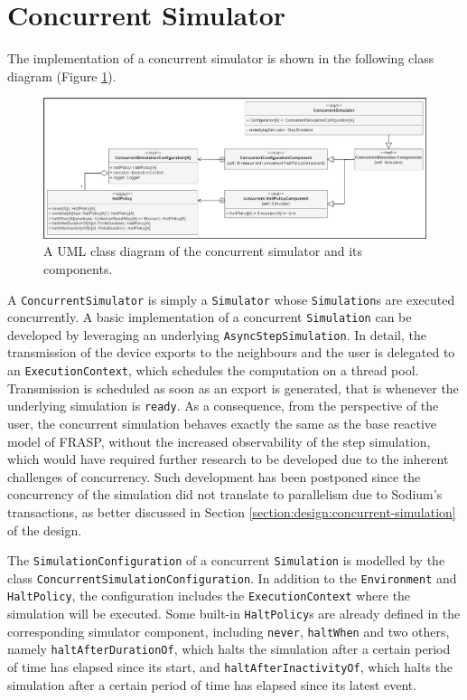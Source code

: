 
\section{Concurrent Simulator}
\label{section:implementation:concurrent-simulator}

The implementation of a concurrent simulator is shown in the following class
diagram (Figure \ref{figure:concurrent-simulator-class-diagram}).

\begin{figure}[!ht]
  \centering
  \includegraphics[width=1\textwidth]{resources/figures/concurrent-simulator-class-diagram.png}
  \caption{A UML class diagram of the concurrent simulator and its components.}
  \label{figure:concurrent-simulator-class-diagram}
\end{figure}

A \texttt{ConcurrentSimulator} is simply a \texttt{Simulator} whose
\texttt{Simulation}s are executed concurrently. A basic implementation of a
concurrent \texttt{Simulation} can be developed by leveraging an underlying
\texttt{AsyncStepSimulation}. In detail, the transmission of the device exports
to the neighbours and the user is delegated to an \texttt{ExecutionContext},
which schedules the computation on a thread pool. Transmission is scheduled as
soon as an export is generated, that is whenever the underlying simulation is
\texttt{ready}. As a consequence, from the perspective of the user, the
concurrent simulation behaves exactly the same as the base reactive model of
FRASP, without the increased observability of the step simulation, which would
have required further research to be developed due to the inherent challenges
of concurrency. Such development has been postponed since the concurrency of
the simulation did not translate to parallelism due to Sodium's transactions,
as better discussed in Section \ref{section:design:concurrent-simulation} of
the design.

The \texttt{SimulationConfiguration} of a concurrent \texttt{Simulation} is
modelled by the class \texttt{ConcurrentSimulationConfiguration}. In addition
to the \texttt{Environment} and \texttt{HaltPolicy}, the configuration includes
the \texttt{ExecutionContext} where the simulation will be executed. Some
built-in \texttt{HaltPolicy}s are already defined in the corresponding
simulator component, including \texttt{never}, \texttt{haltWhen} and two
others, namely \texttt{haltAfterDurationOf}, which halts the simulation after a
certain period of time has elapsed since its start, and
\texttt{haltAfterInactivityOf}, which halts the simulation after a certain
period of time has elapsed since its latest event.

